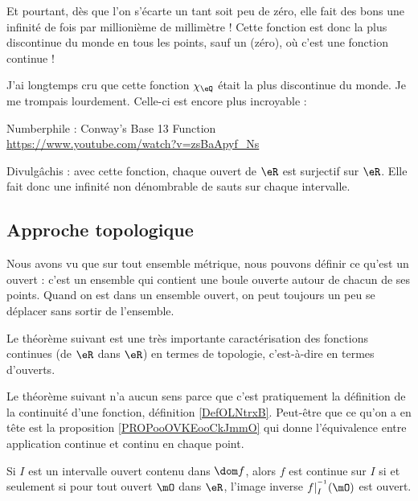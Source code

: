 Et pourtant, dès que l'on s'écarte un tant soit peu de zéro, elle fait des bons une infinité de fois par millionième de millimètre ! Cette fonction est donc la plus discontinue du monde en tous les points, sauf un (zéro), où c'est une fonction continue !

\begin{normaltext}
	J'ai longtemps cru que cette fonction \( \chi_{\eQ}\) était la plus discontinue du monde. Je me trompais lourdement. Celle-ci est encore plus incroyable :
	\begin{center}
		Numberphile : Conway's Base 13 Function\\
		\url{https://www.youtube.com/watch?v=zsBaApyf_Ns}
	\end{center}
	Divulgâchis : avec cette fonction, chaque ouvert de \( \eR\) est surjectif sur \( \eR\). Elle fait donc une infinité non dénombrable de sauts sur chaque intervalle.
\end{normaltext}

\subsection{Approche topologique}

Nous avons vu que sur tout ensemble métrique, nous pouvons définir ce qu'est un ouvert : c'est un ensemble qui contient une boule ouverte autour de chacun de ses points. Quand on est dans un ensemble ouvert, on peut toujours un peu se déplacer sans sortir de l'ensemble.

Le théorème suivant est une très importante caractérisation des fonctions continues (de \( \eR\) dans \( \eR\)) en termes de topologie, c'est-à-dire en termes d'ouverts.

\begin{probleme}
	Le théorème suivant n'a aucun sens parce que c'est pratiquement la définition de la continuité d'une fonction, définition \ref{DefOLNtrxB}. Peut-être que ce qu'on a en tête est la proposition \ref{PROPooOVKEooCkJmmO} qui donne l'équivalence entre application continue et continu en chaque point.
\end{probleme}

\begin{theorem}     \label{ThoContInvOuvert}
	Si \( I\) est un intervalle ouvert contenu dans \( \dom f\), alors \( f\) est continue sur \( I\) si et seulement si pour tout ouvert \( \mO\) dans \( \eR\), l'image inverse \( f|_I^{^{-1}}(\mO)\) est ouvert.
\end{theorem}

